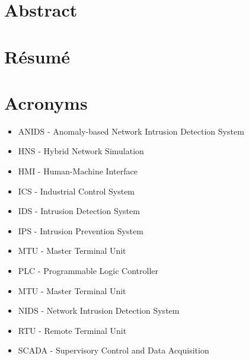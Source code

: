 \documentclass[12pt,]{article}
\begin{document}
\newpage
\mbox{} \thispagestyle{empty}

\clearpage

\section*{Abstract}\label{abstract}

\newpage
\mbox{} \thispagestyle{empty}

\clearpage

\section*{Résumé}\label{resume}

\newpage
\mbox{} \thispagestyle{empty}

\clearpage

\tableofcontents

\cleardoublepage

\listoffigures

\newpage
\mbox{} \thispagestyle{empty}

\clearpage

\section*{Acronyms}\label{acronyms}

\begin{itemize}
\itemsep1pt\parskip0pt
\item
  ANIDS - Anomaly-based Network Intrusion Detection System
\item
  HNS - Hybrid Network Simulation
\item
  HMI - Human-Machine Interface
\item
  ICS - Industrial Control System
\item
  IDS - Intrusion Detection System
\item
  IPS - Intrusion Prevention System
\item
  MTU - Master Terminal Unit
\item
  PLC - Programmable Logic Controller
\item
  MTU - Master Terminal Unit
\item
  NIDS - Network Intrusion Detection System
\item
  RTU - Remote Terminal Unit
\item
  SCADA - Supervisory Control and Data Acquisition
\end{itemize}
\end{document}
